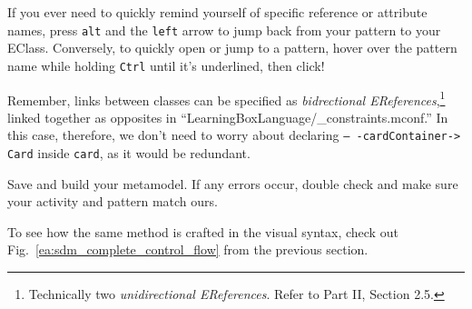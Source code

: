 \begin{itemize}

\itemWithRightTriangle If you ever need to quickly remind yourself of specific reference or attribute names, press \texttt{alt} and the \texttt{left}
arrow to jump back from your pattern to your EClass. Conversely, to quickly open
or jump to a pattern, hover over the pattern name while holding \texttt{Ctrl}
until it's underlined, then click!

\itemWithRightTriangle Remember, links between classes can be specified as \emph{bidrectional EReferences},\footnote{Technically two
\emph{unidirectional EReferences}. Refer to Part II, Section 2.5.} linked together as opposites in ``LearningBoxLanguage/\_con\-straints.mconf.'' In this case,
therefore, we don't need to worry about declaring \texttt{--
-cardContainer-> Card} inside \texttt{card}, as it would be redundant.

\itemWithRightTriangle Save and build your metamodel. If any errors occur, double check and make sure your activity and pattern match ours. 

\itemWithRightTriangle To see how the same method is crafted in the visual syntax, check out Fig.~\ref{ea:sdm_complete_control_flow} from the previous
section.

\end{itemize}
